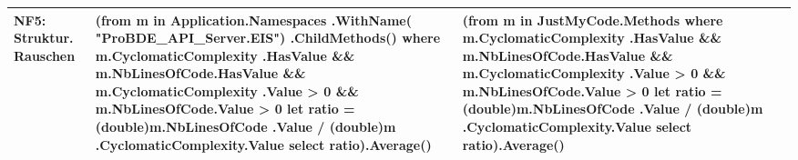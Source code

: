 \begin{longtable}{|>{\raggedright\arraybackslash}p{}|>{\raggedright\arraybackslash}p{}|>{\raggedright\arraybackslash}p{}|}
NF5: Struktur. Rauschen &
{\ttfamily
(from m in Application.Namespaces\newline
\quad .WithName(\newline
\quad \quad "ProBDE\_API\_Server.EIS")\newline
\quad .ChildMethods()\newline
where m.CyclomaticComplexity\newline
\quad .HasValue \newline
\quad \&\& m.NbLinesOfCode.HasValue\newline
\quad \&\& m.CyclomaticComplexity\newline
\quad \quad .Value > 0 \newline
\quad \&\& m.NbLinesOfCode.Value > 0\newline
let ratio = (double)m.NbLinesOfCode\newline
\quad .Value / (double)m\newline
\quad .CyclomaticComplexity.Value\newline
select ratio).Average()
}
&
{\ttfamily
(from m in JustMyCode.Methods\newline
where m.CyclomaticComplexity\newline
\quad .HasValue \newline
\quad \&\& m.NbLinesOfCode.HasValue\newline
\quad \&\& m.CyclomaticComplexity\newline
\quad \quad .Value > 0 \newline
\quad \&\& m.NbLinesOfCode.Value > 0\newline
let ratio = (double)m.NbLinesOfCode\newline
\quad .Value / (double)m\newline
\quad .CyclomaticComplexity.Value\newline
select ratio).Average()
}
\\ \hline


\end{longtable}
